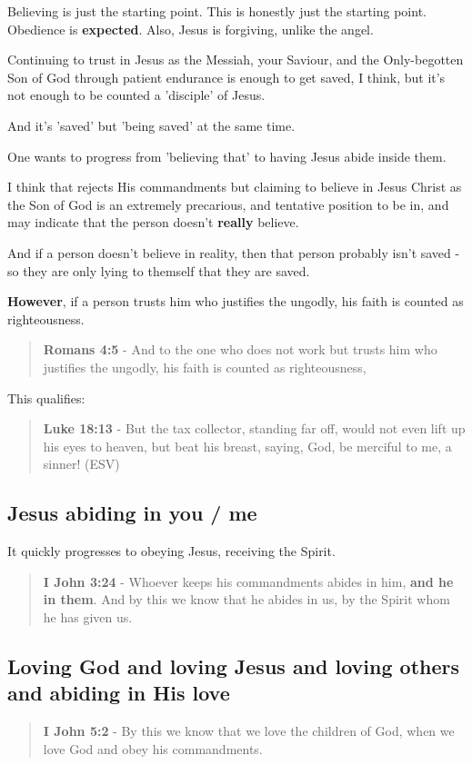 \documentclass[11pt]{article}
\begin{document}
Believing is just the starting point. This is honestly just the starting point. Obedience is \textbf{expected}. Also, Jesus is forgiving, unlike the angel.

Continuing to trust in Jesus as the Messiah, your Saviour, and the Only-begotten Son of God through patient endurance is enough to get saved, I think, but it's not enough to be counted a 'disciple' of Jesus.

And it's 'saved' but 'being saved' at the same time.

One wants to progress from 'believing that' to having Jesus abide inside them.

I think that rejects His commandments but claiming to believe in Jesus Christ as the Son of God is an extremely precarious, and tentative position to be in,
and may indicate that the person doesn't \textbf{really} believe.

And if a person doesn't believe in reality, then that person probably isn't saved - so they are only lying to themself that they are saved.

\textbf{However}, if a person trusts him who justifies the ungodly, his faith is counted as righteousness.

\begin{quote}
\textbf{Romans 4:5} - And to the one who does not work but trusts him who justifies the ungodly, his faith is counted as righteousness,
\end{quote}

This qualifies:

\begin{quote}
\textbf{Luke 18:13} - But the tax collector, standing far off, would not even lift up his eyes to heaven, but beat his breast, saying, God, be merciful to me, a sinner! (ESV)
\end{quote}

\subsection{Jesus abiding in \textbf{you} / \textbf{me}}
\label{sec:orga44f5bb}
It quickly progresses to obeying Jesus, receiving the Spirit.

\begin{quote}
\textbf{I John 3:24} - Whoever keeps his commandments abides in him, \textbf{and he in them}. And by this we know that he abides in us, by the Spirit whom he has given us.
\end{quote}

\subsection{Loving God and loving Jesus and loving others and abiding in His love}
\label{sec:org5548cdb}
\begin{quote}
\textbf{I John 5:2} - By this we know that we love the children of God, when we love God and obey his commandments.
\end{quote}
\end{document}
